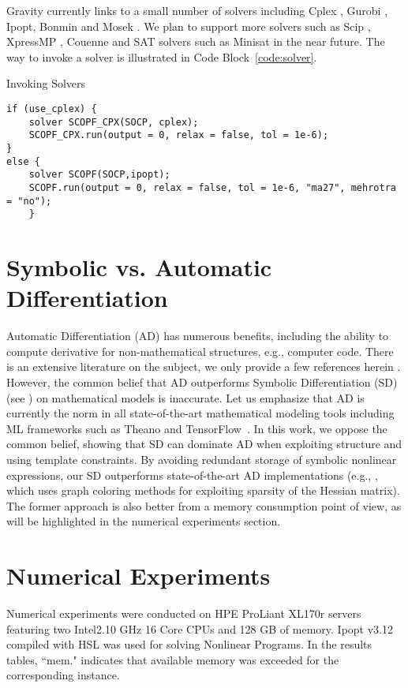 \documentclass{article}
\newcommand{\tensor}{{\sc TensorFlow}}
\newcommand{\theano}{{\sc Theano}}
\newcommand{\ipopt}{{\sc Ipopt}}
\newcommand{\cplex}{{\sc Cplex}}
\newcommand{\gurobi}{{\sc Gurobi}}
\newcommand{\xpress}{{\sc XpressMP}}
\newcommand{\minisat}{{\sc Minisat}}
\newcommand{\scip}{{\sc Scip}}
\newcommand{\bonmin}{{\sc Bonmin}}
\newcommand{\couenne}{{\sc Couenne}}
\newcommand{\Gravity}{{\sc Gravity}}
\newcommand{\mosek}{{\sc Mosek}}
\begin{document}
\Gravity{} currently links to a small number of solvers including \cplex{} \cite{cplex}, \gurobi{} \cite{gurobi}, \ipopt{}\cite{ipopt}, \bonmin{}\cite{bonmin} and \mosek{} \cite{mosek}. We plan to support more solvers such as \scip{} \cite{scip}, \xpress{} \cite{xpress}, \couenne{} \cite{couenne} and SAT solvers such as \minisat{} \cite{minisat} in the near future.
The way to invoke a solver is illustrated in Code Block~\ref{code:solver}.

\begin{code}[h!]
\caption{Invoking Solvers}
\begin{verbatim}
if (use_cplex) {
    solver SCOPF_CPX(SOCP, cplex);
    SCOPF_CPX.run(output = 0, relax = false, tol = 1e-6);
}
else {
    solver SCOPF(SOCP,ipopt);
    SCOPF.run(output = 0, relax = false, tol = 1e-6, "ma27", mehrotra = "no");
    }
\end{verbatim}
\label{code:solver}
\end{code}
    
\section{Symbolic vs. Automatic Differentiation}
Automatic Differentiation (AD) has numerous benefits, including the ability to compute derivative for non-mathematical structures, e.g., computer code. There is an extensive literature on the subject, we only provide a few references herein \cite{book:rall1981,Griewank:1996:AAP:229473.229474,rall1996introduction,fournier2012ad,CppAD2012}. However, the common belief that AD outperforms Symbolic Differentiation (SD) (see \cite{fournier2012ad,Sehyoun_17}) on mathematical models is \mbox{inaccurate}. Let us emphasize that AD is currently the norm in all state-of-the-art mathematical modeling tools including ML frameworks such as \theano{} \cite{theano} and \tensor{}~\cite{tensor}.
In this work, we oppose the common belief, showing that SD can dominate AD when exploiting structure and using template constraints. By avoiding redundant storage of symbolic nonlinear expressions, our SD outperforms state-of-the-art AD implementations (e.g., \cite{DunningHuchetteLubin2017}, which uses graph coloring methods for exploiting sparsity of the Hessian matrix). The former approach is also better from a memory consumption point of view, as will be highlighted in the numerical experiments section.

\section{Numerical Experiments}
Numerical experiments were conducted on HPE ProLiant XL170r servers featuring two Intel2.10 GHz 16 Core CPUs and 128 GB of memory.
\ipopt{} v3.12 \cite{ipopt} compiled with HSL \cite{hsl_lib} was used for solving Nonlinear Programs. In the results tables,
``mem." indicates that available memory was exceeded for the corresponding instance.
\end{document}
